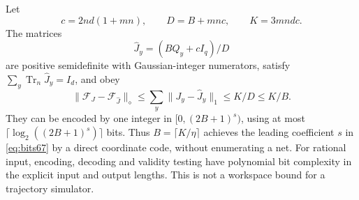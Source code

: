 \begin{theorem}\label{thm:intrinsiccodec67}
Let
\begin{equation}\label{eq:codeconstants67}
 c=2nd(1+mn),\qquad D=B+mnc,\qquad K=3mndc.
\end{equation}
The matrices
\begin{equation}\label{eq:intrinsicrepair67}
 \widehat J_y=(BQ_y+cI_q)/D
\end{equation}
are positive semidefinite with Gaussian-integer numerators, satisfy
$\sum_y\operatorname{Tr}_n\widehat J_y=I_d$, and obey
\begin{equation}\label{eq:intrinsicerror67}
 \|\mathcal F_J-\mathcal F_{\widehat J}\|_{\diamond}
 \le\sum_y\|J_y-\widehat J_y\|_1\le K/D\le K/B.
\end{equation}
They can be encoded by one integer in $[0,(2B+1)^s)$, using at most
$\lceil\log_2((2B+1)^s)\rceil$ bits. Thus $B=\lceil K/\eta\rceil$
achieves the leading coefficient $s$ in \eqref{eq:bits67} by a direct
coordinate code, without enumerating a net. For rational input,
encoding, decoding and validity testing have polynomial bit complexity
in the explicit input and output lengths. This is not a workspace
bound for a trajectory simulator.
\end{theorem}
